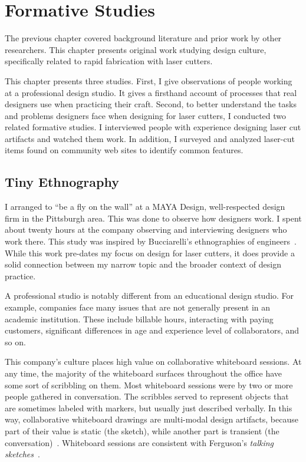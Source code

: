 \chapter{Formative Studies}
\label{sec:formative}

The previous chapter covered background literature and prior work by
other researchers. This chapter presents original work studying design
culture, specifically related to rapid fabrication with laser cutters.

This chapter presents three studies. First, I give observations of
people working at a professional design studio. It gives a firsthand
account of processes that real designers use when practicing their
craft. Second, to better understand the tasks and problems designers
face when designing for laser cutters, I conducted two related
formative studies. I interviewed people with experience designing
laser cut artifacts and watched them work. In addition, I surveyed and
analyzed laser-cut items found on community web sites to identify
common features.

\section{Tiny Ethnography}
\label{sec:formative-tiny-ethnography}

I arranged to ``be a fly on the wall'' at a MAYA Design,
well-respected design firm in the Pittsburgh area. This was done to
observe how designers work. I spent about twenty hours at the company
observing and interviewing designers who work there. This study was
inspired by Bucciarelli's ethnographies of
engineers~\cite{bucciarelli-designing-engineers}. While this work
pre-dates my focus on design for laser cutters, it does provide a
solid connection between my narrow topic and the broader context of
design practice.

A professional studio is notably different from an educational design
studio. For example, companies face many issues that are not generally
present in an academic institution. These include billable hours,
interacting with paying customers, significant differences in age and
experience level of collaborators, and so on.

This company's culture places high value on collaborative whiteboard
sessions. At any time, the majority of the whiteboard surfaces
throughout the office have some sort of scribbling on them. Most
whiteboard sessions were by two or more people gathered in
conversation. The scribbles served to represent objects that are
sometimes labeled with markers, but usually just described
verbally. In this way, collaborative whiteboard drawings are
multi-modal design artifacts, because part of their value is static
(the sketch), while another part is transient (the
conversation)~\cite{ju-navigator}. Whiteboard sessions are consistent
with Ferguson's \textit{talking sketches}~\cite{ferguson-engineering}.

